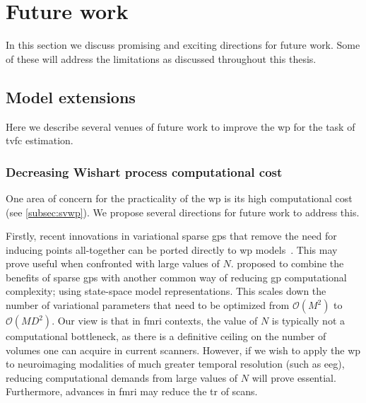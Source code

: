 \clearpage
\section{Future work}

In this section we discuss promising and exciting directions for future work.
Some of these will address the limitations as discussed throughout this thesis.

\subsection{Model extensions}\label{subsec:model-extensions}

Here we describe several venues of future work to improve the \gls{wp} for the task of \gls{tvfc} estimation.

\subsubsection{Decreasing Wishart process computational cost}\label{subsubsec:decreasing-wp-computational-cost}

One area of concern for the practicality of the \gls{wp} is its high computational cost (see \cref{subsec:svwp}).
We propose several directions for future work to address this.

Firstly, recent innovations in variational sparse \glspl{gp} that remove the need for inducing points all-together can be ported directly to \gls{wp} models~\parencite[see][]{Saatchi2011, Adam2020, Wilkinson2021}.
This may prove useful when confronted with large values of $N$.
%
\textcite{Adam2020} proposed to combine the benefits of sparse \glspl{gp} with another common way of reducing \gls{gp} computational complexity; using state-space model representations.
This scales down the number of variational parameters that need to be optimized from $\mathcal{O}(M^2)$ to $\mathcal{O}(MD^2)$.
Our view is that in \gls{fmri} contexts, the value of $N$ is typically not a computational bottleneck, as there is a definitive ceiling on the number of volumes one can acquire in current scanners.
However, if we wish to apply the \gls{wp} to neuroimaging modalities of much greater temporal resolution (such as \gls{eeg}), reducing computational demands from large values of $N$ will prove essential.
Furthermore, advances in \gls{fmri} may reduce the \gls{tr} of scans.

